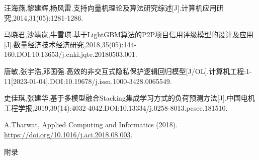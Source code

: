 \documentclass{MathorCupmodeling}
\begin{document}
\begin{spacing}{1.08}
\begin{thebibliography}{99}
	汪海燕,黎建辉,杨风雷.支持向量机理论及算法研究综述[J].计算机应用研究,2014,31(05):1281-1286.

	马晓君,沙靖岚,牛雪琪.基于LightGBM算法的P2P项目信用评级模型的设计及应用[J].数量经济技术经济研究,2018,35(05):144-160.DOI:10.13653/j.cnki.jqte.20180503.001.

	唐敏,张宇浩,邓国强.高效的非交互式隐私保护逻辑回归模型[J/OL].计算机工程:1-11[2023-01-04].DOI:10.19678/j.issn.1000-3428.0065549.

	史佳琪,张建华.基于多模型融合Stacking集成学习方式的负荷预测方法[J].中国电机工程学报,2019,39(14):4032-4042.DOI:10.13334/j.0258-8013.pcsee.181510.


	A.Tharwat, Applied Computing and Informatics (2018). \url{https://doi.org/10.1016/j.aci.2018.08.003}.

	\end{thebibliography}
	\end{spacing}
	\newpage


	\begin{center}
		\heiti{} 附\hspace{2pc}录
	\end{center}
\end{document}

